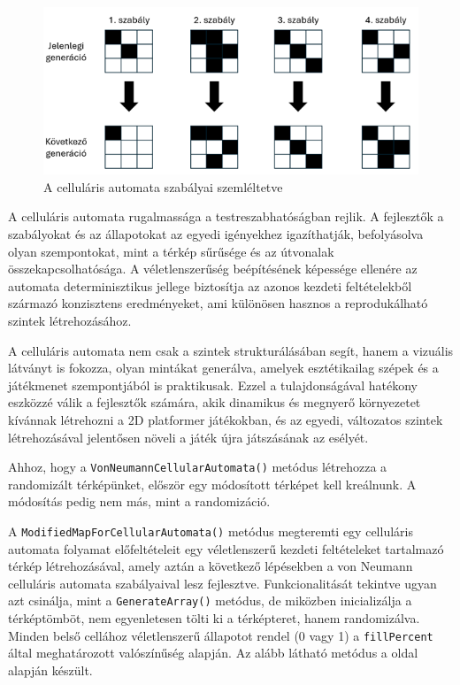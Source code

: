 \begin{figure}[ht]
\centering
\includegraphics[width = \textwidth]{images/cellularprincipals.png}
\caption{A celluláris automata szabályai szemléltetve}
\label{fig:cellularprincipals}
\end{figure}

\newpage
A celluláris automata rugalmassága a testreszabhatóságban rejlik. A fejlesztők a szabályokat és az állapotokat az egyedi igényekhez igazíthatják, befolyásolva olyan szempontokat, mint a térkép sűrűsége és az útvonalak összekapcsolhatósága. A véletlenszerűség beépítésének képessége ellenére az automata determinisztikus jellege biztosítja az azonos kezdeti feltételekből származó konzisztens eredményeket, ami különösen hasznos a reprodukálható szintek létrehozásához. \cite{cellular}

A celluláris automata nem csak a szintek strukturálásában segít, hanem a vizuális látványt is fokozza, olyan mintákat generálva, amelyek esztétikailag szépek és a játékmenet szempontjából is praktikusak. Ezzel a tulajdonságával hatékony eszközzé válik a fejlesztők számára, akik dinamikus és megnyerő környezetet kívánnak létrehozni a 2D platformer játékokban, és az egyedi, változatos szintek létrehozásával jelentősen növeli a játék újra játszásának az esélyét. \cite{cellular}


Ahhoz, hogy a \texttt{VonNeumannCellularAutomata()} metódus létrehozza a randomizált térképünket, először egy módosított térképet kell kreálnunk. A módosítás pedig nem más, mint a randomizáció.

A \texttt{ModifiedMapForCellularAutomata()} metódus megteremti egy celluláris automata folyamat előfeltételeit egy véletlenszerű kezdeti feltételeket tartalmazó térkép létrehozásával, amely aztán a következő lépésekben a von Neumann celluláris automata szabályaival lesz fejlesztve. Funkcionalitását tekintve ugyan azt csinálja, mint a \texttt{GenerateArray()} metódus, de miközben inicializálja a térképtömböt, nem egyenletesen tölti ki a térképteret, hanem randomizálva. Minden belső cellához véletlenszerű állapotot rendel (0 vagy 1) a \texttt{fillPercent} által meghatározott valószínűség alapján. Az alább látható metódus a \cite{mapgenerator} oldal alapján készült.

